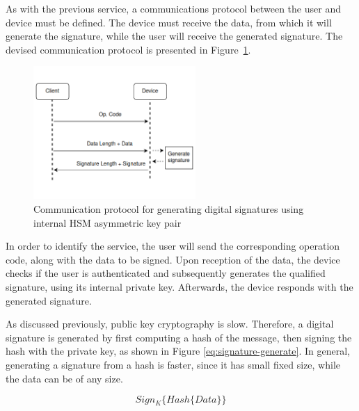As with the previous service, a communications protocol between the user and device must be defined. The device must receive the data, from which it will generate the signature, while the user will receive the generated signature.
The devised communication protocol is presented in Figure~\ref{fig:protocol:signature-generate}.
\begin{figure}[h!]
	\centering
	\includegraphics[width=0.55\textwidth]{./Images/signature-generate.png}
	\caption{Communication protocol for generating digital signatures using internal HSM asymmetric key pair}
	\label{fig:protocol:signature-generate}
\end{figure}
In order to identify the service, the user will send the corresponding operation code, along with the data to be signed.
Upon reception of the data, the device checks if the user is authenticated and subsequently generates the qualified signature, using its internal private key.
Afterwards, the device responds with the generated signature.

As discussed previously, public key cryptography is slow. Therefore, a digital signature is generated by first computing a hash of the message, then signing the hash with the private key, as shown in Figure \ref{eq:signature-generate}. In general, generating a signature from a hash is faster, since it has small fixed size, while the data can be of any size.

\begin{equation}
	\label{eq:signature-generate}
	Sign_{K}\{Hash\{Data\}\}
\end{equation}


